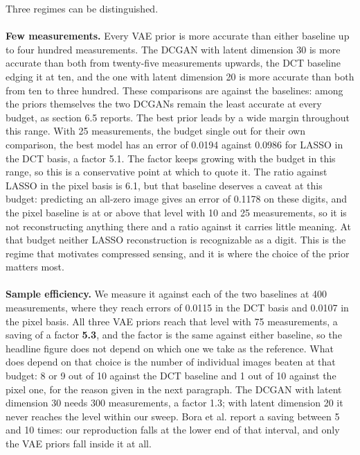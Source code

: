 Three regimes can be distinguished.
\\\\
\textbf{Few measurements.} Every VAE prior is more accurate than either baseline up to four hundred measurements. The DCGAN with latent dimension 30 is more accurate than both from twenty-five measurements upwards, the DCT baseline edging it at ten, and the one with latent dimension 20 is more accurate than both from ten to three hundred. These comparisons are against the baselines: among the priors themselves the two DCGANs remain the least accurate at every budget, as section 6.5 reports. The best prior leads by a wide margin throughout this range. With 25 measurements, the budget \cite{bora2017} single out for their own comparison, the best model has an error of 0.0194 against 0.0986 for LASSO in the DCT basis, a factor 5.1. The factor keeps growing with the budget in this range, so this is a conservative point at which to quote it. The ratio against LASSO in the pixel basis is 6.1, but that baseline deserves a caveat at this budget: predicting an all-zero image gives an error of 0.1178 on these digits, and the pixel baseline is at or above that level with 10 and 25 measurements, so it is not reconstructing anything there and a ratio against it carries little meaning. At that budget neither LASSO reconstruction is recognizable as a digit. This is the regime that motivates compressed sensing, and it is where the choice of the prior matters most.
\\\\
\textbf{Sample efficiency.} We measure it against each of the two baselines at 400 measurements, where they reach errors of 0.0115 in the DCT basis and 0.0107 in the pixel basis. All three VAE priors reach that level with 75 measurements, a saving of a factor \textbf{5.3}, and the factor is the same against either baseline, so the headline figure does not depend on which one we take as the reference. What does depend on that choice is the number of individual images beaten at that budget: 8 or 9 out of 10 against the DCT baseline and 1 out of 10 against the pixel one, for the reason given in the next paragraph. The DCGAN with latent dimension 30 needs 300 measurements, a factor 1.3; with latent dimension 20 it never reaches the level within our sweep. Bora et al. report a saving between 5 and 10 times: our reproduction falls at the lower end of that interval, and only the VAE priors fall inside it at all.
\\\\
